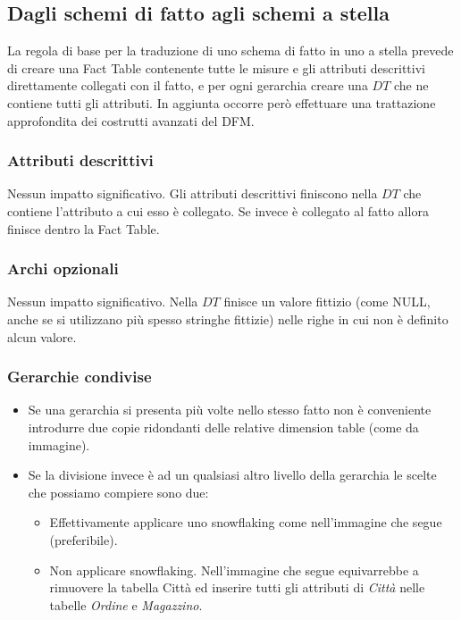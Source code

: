 \subsection{Dagli schemi di fatto agli schemi a stella}
La regola di base per la traduzione di uno schema di fatto in uno a stella prevede di creare una Fact Table contenente tutte le misure e gli attributi descrittivi direttamente collegati con il fatto, e per ogni gerarchia creare una $DT$ che ne contiene tutti gli attributi.\newline
In aggiunta occorre però effettuare una trattazione approfondita dei costrutti avanzati del DFM.
\subsubsection{Attributi descrittivi}
Nessun impatto significativo. Gli attributi descrittivi finiscono nella $DT$ che contiene l'attributo a cui esso è collegato. Se invece è collegato al fatto allora finisce dentro la Fact Table.
\subsubsection{Archi opzionali}
Nessun impatto significativo. Nella $DT$ finisce un valore fittizio (come NULL, anche se si utilizzano più spesso stringhe fittizie) nelle righe in cui non è definito alcun valore.
\subsubsection{Gerarchie condivise}
\begin{itemize}
	\item Se una gerarchia si presenta più volte nello stesso fatto non è conveniente introdurre due copie ridondanti delle relative dimension table (come da immagine).
	\item Se la divisione invece è ad un qualsiasi altro livello della gerarchia le scelte che possiamo compiere sono due:
	\begin{itemize}
		\item Effettivamente applicare uno snowflaking come nell'immagine che segue (preferibile).
		\item Non applicare snowflaking. Nell'immagine che segue equivarrebbe a rimuovere la tabella Città ed inserire tutti gli attributi di \textit{Città} nelle tabelle \textit{Ordine} e \textit{Magazzino}.
	\end{itemize}
\end{itemize}
